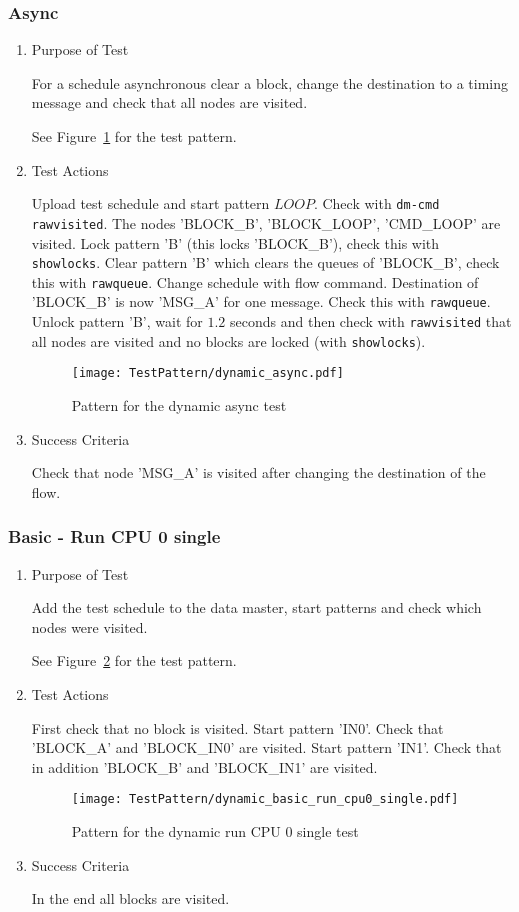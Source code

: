 \subsubsection{Async}
\begin{enumerate}
	\item Purpose of Test

	For a schedule asynchronous clear a block, change the destination to a timing message and check that all nodes are visited.

	See Figure~\ref{fig:Pattern_for_the_dynamic_async_test} for the test pattern.
	\item Test Actions

	Upload test schedule and start pattern $LOOP$. Check with \texttt{dm-cmd rawvisited}. The
	nodes 'BLOCK\_B', 'BLOCK\_LOOP', 'CMD\_LOOP' are visited. Lock pattern 'B' (this locks 'BLOCK\_B'), check this with
	\texttt{showlocks}. Clear pattern 'B' which clears the queues of 'BLOCK\_B', check this with \texttt{rawqueue}.
	Change schedule with flow command. Destination of 'BLOCK\_B' is now 'MSG\_A' for one message. Check this
	with \texttt{rawqueue}. Unlock pattern 'B', wait for $1.2$ seconds and then check with \texttt{rawvisited} that all
	nodes are visited and no blocks are locked (with \texttt{showlocks}).
    \begin{figure}
        \centering
        \texttt{[image: TestPattern/dynamic\_async.pdf]}
        \caption{Pattern for the dynamic async test}
        \label{fig:Pattern_for_the_dynamic_async_test}
    \end{figure}
	\item Success Criteria

	Check that node 'MSG\_A' is visited after changing the destination of the flow.
\end{enumerate}
\subsubsection{Basic - Run CPU 0 single}
\begin{enumerate}
	\item Purpose of Test

    Add the test schedule to the data master, start patterns and check which nodes were visited.

	See Figure~\ref{fig:Pattern_for_the_dynamic_run_CPU_0_single_test} for the test pattern.
	\item Test Actions

    First check that no block is visited. Start pattern 'IN0'. Check that 'BLOCK\_A' and 'BLOCK\_IN0' are visited.
    Start pattern 'IN1'. Check that in addition 'BLOCK\_B' and 'BLOCK\_IN1' are visited.
    \begin{figure}
        \centering
        \texttt{[image: TestPattern/dynamic\_basic\_run\_cpu0\_single.pdf]}
        \caption{Pattern for the dynamic run CPU 0 single test}
        \label{fig:Pattern_for_the_dynamic_run_CPU_0_single_test}
    \end{figure}
	\item Success Criteria

	In the end all blocks are visited.
\end{enumerate}
